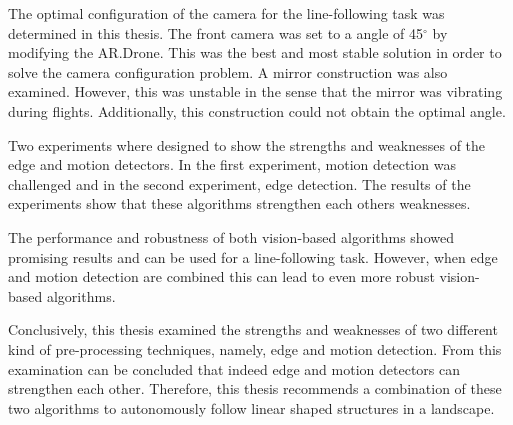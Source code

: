 \documentclass[a4paper]{article}
\begin{document}
The optimal configuration of the camera for the line-following task was determined in this thesis. The front camera was set to a angle of 45$^{\circ}$ by modifying the AR.Drone. This was the best and most stable solution in order to solve the camera configuration problem. A mirror construction was also examined. However, this was unstable in the sense that the mirror was vibrating during flights. Additionally, this construction could not obtain the optimal angle.

Two experiments where designed to show the strengths and weaknesses of the edge and motion detectors. In the first experiment, motion detection was challenged and in the second experiment, edge detection. The results of the experiments show that these algorithms strengthen each others weaknesses.

The performance and robustness of both vision-based algorithms showed promising results and can be used for a line-following task. However, when edge and motion detection are combined this can lead to even more robust vision-based algorithms.

Conclusively, this thesis examined the strengths and weaknesses of two different kind of pre-processing techniques, namely, edge and motion detection. From this examination can be concluded that indeed edge and motion detectors can strengthen each other. Therefore, this thesis recommends a combination of these two algorithms to autonomously follow linear shaped structures in a landscape.

\newpage
\end{document}
